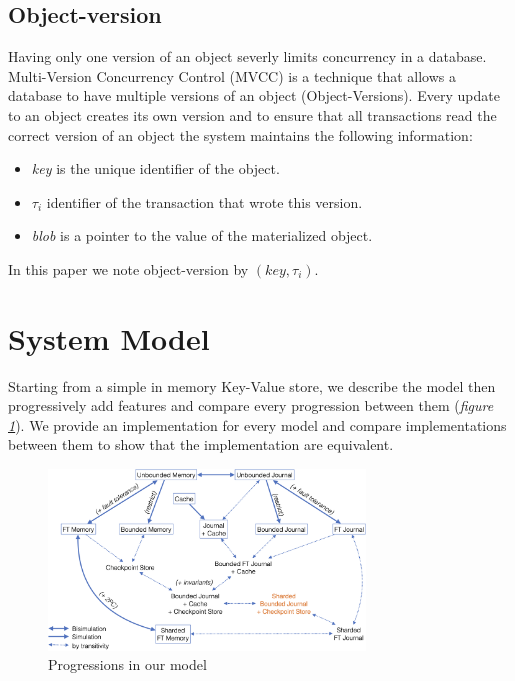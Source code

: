 \documentclass[systeme,french,english]{compas2022}
\begin{document}
\subsection{Object-version}

Having only one version of an object severly limits concurrency in a database.
Multi-Version Concurrency Control (MVCC) is a technique that allows a database to have multiple versions of an object (Object-Versions).
Every update to an object creates its own version and to ensure that all transactions read the correct version of an object the system maintains the following information: 
\begin{itemize}
  \item \emph{key} is the unique identifier of the object.
  \item \emph{$\tau_i$} identifier of the transaction that wrote this version.
  \item \emph{blob} is a pointer to the value of the materialized object.
\end{itemize}

In this paper we note object-version by $(key ,\tau_i)$.

\section{System Model}

Starting from a simple in memory Key-Value store, we describe the model then progressively add features and compare every progression between them (\emph{figure \ref{fig:transitions}}).
We provide an implementation for every model and compare implementations between them to show that the implementation are equivalent.

\begin{figure}[tp]
  \centering
  \includegraphics[width=0.75\textwidth]{figures/transitions.png}
  \caption{Progressions in our model}
  \label{fig:transitions}
\end{figure}
\end{document}
